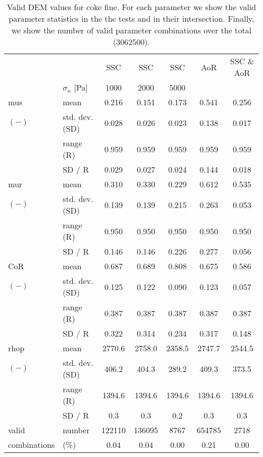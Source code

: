 \begin{table}[htbp] 
 \centering 
\begin{tabular}{ll|ccccc} 
 \hline 
 &    & SSC & SSC & SSC & AoR   & SSC \& AoR \\ 
 & $\sigma_n$  [Pa]  & 1000 & 2000 & 5000 &   &  \\ 
 \hline 
\acs{mus} & mean & 0.216 & 0.151 & 0.173 & 0.541 & 0.256 \\ 
$(-)$ & std. dev. (SD) & 0.028 & 0.026 & 0.023 & 0.138 & 0.017 \\ 
 & range (\acs{R}) & 0.959 & 0.959 & 0.959 & 0.959 & 0.959 \\ 
 & SD / R & 0.029 & 0.027 & 0.024 & 0.144 & 0.018 \\ 
 \hline 
\acs{mur} & mean & 0.310 & 0.330 & 0.229 & 0.612 & 0.535 \\ 
$(-)$ & std. dev. (SD) & 0.139 & 0.139 & 0.215 & 0.263 & 0.053 \\ 
 & range (\acs{R}) & 0.950 & 0.950 & 0.950 & 0.950 & 0.950 \\ 
 & SD / R & 0.146 & 0.146 & 0.226 & 0.277 & 0.056 \\ 
 \hline 
\acs{CoR} & mean & 0.687 & 0.689 & 0.808 & 0.675 & 0.586 \\ 
$(-)$ & std. dev. (SD) & 0.125 & 0.122 & 0.090 & 0.123 & 0.057 \\ 
 & range (\acs{R}) & 0.387 & 0.387 & 0.387 & 0.387 & 0.387 \\ 
 & SD / R & 0.322 & 0.314 & 0.234 & 0.317 & 0.148 \\ 
 \hline 
\acs{rhop} & mean & 2770.6 & 2758.0 & 2358.5 & 2747.7 & 2544.5 \\ 
$(-)$ & std. dev. (SD) & 406.2 & 404.3 & 289.2 & 409.3 & 373.5 \\ 
 & range (\acs{R}) & 1394.6 & 1394.6 & 1394.6 & 1394.6 & 1394.6 \\ 
 & SD / R &  0.3 &  0.3 &  0.2 &  0.3 &  0.3 \\ 
 \hline 
valid & number & 122110 & 136095 & 8767 & 654785 & 2718 \\ 
combinations & (\%)  & 0.04 & 0.04 & 0.00 & 0.21 & 0.00 \\ 
 \hline 
\end{tabular} 
\caption[Valid DEM values for coke fine]{Valid DEM values for coke fine. For
each parameter we show the valid parameter statistics in the the tests and in their intersection. Finally, we show the number of valid parameter combinations over the total (3062500).}
\label{tab:26DEMvalidvaluescokefine} 
\end{table}